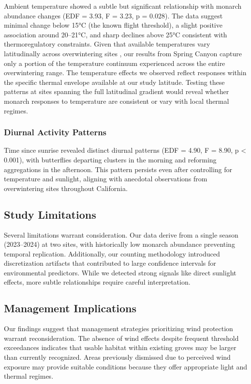 Ambient temperature showed a subtle but significant relationship with monarch abundance changes (EDF = 3.93, F = 3.23, p = 0.028). The data suggest minimal change below 15°C (the known flight threshold), a slight positive association around 20--21°C, and sharp declines above 25°C consistent with thermoregulatory constraints. Given that available temperatures vary latitudinally across overwintering sites \autocite{Saniee2022_3VN7I68M}, our results from Spring Canyon capture only a portion of the temperature continuum experienced across the entire overwintering range. The temperature effects we observed reflect responses within the specific thermal envelope available at our study latitude. Testing these patterns at sites spanning the full latitudinal gradient would reveal whether monarch responses to temperature are consistent or vary with local thermal regimes.

\subsubsection{Diurnal Activity Patterns}

Time since sunrise revealed distinct diurnal patterns (EDF = 4.90, F = 8.90, p < 0.001), with butterflies departing clusters in the morning and reforming aggregations in the afternoon. This pattern persists even after controlling for temperature and sunlight, aligning with anecdotal observations from overwintering sites throughout California.

\subsection{Study Limitations}

Several limitations warrant consideration. Our data derive from a single season (2023--2024) at two sites, with historically low monarch abundance preventing temporal replication. Additionally, our counting methodology introduced discretization artifacts that contributed to large confidence intervals for environmental predictors. While we detected strong signals like direct sunlight effects, more subtle relationships require careful interpretation.

\subsection{Management Implications}

Our findings suggest that management strategies prioritizing wind protection warrant reconsideration. The absence of wind effects despite frequent threshold exceedances indicates that usable habitat within existing groves may be larger than currently recognized. Areas previously dismissed due to perceived wind exposure may provide suitable conditions because they offer appropriate light and thermal regimes.


